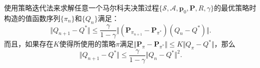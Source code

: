 \begin{theorem}[策略迭代算法的收敛率]
    使用策略迭代法来求解任意一个马尔科夫决策过程$\{\mathcal{S}, \mathcal{A}, \mathbf{p}_0, \mathbf{P}, R, \gamma\}$的最优策略时构造的值函数序列$\{\pi_n\}$和$\{Q_n\}$满足：
    \begin{equation}
        \Vert Q_{n+1} - Q^* \Vert
        \le \frac{\gamma}{1 - \gamma} 
        \Vert (\mathbf{P}_{\pi_{n+1}} - \mathbf{P}_{\pi^*})
        (Q_{n} - Q^*)\Vert.
    \end{equation}
    而且，如果存在$K$使得所使用的策略$\pi$满足$\Vert \mathbf{P}_{\pi} - \mathbf{P}_{\pi^*}\Vert \le K \Vert Q_{\pi} - Q^* \Vert$，那么
    \begin{equation}
        \Vert Q_{n+1} - Q^* \Vert
        \le \frac{\gamma}{1 - \gamma} 
        \Vert Q_{n} - Q^* \Vert^2.
    \end{equation}
\end{theorem}
